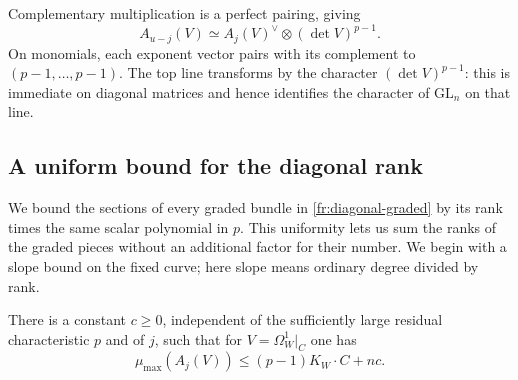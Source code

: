 Complementary multiplication is a perfect pairing, giving
\begin{equation}\label{fr:socle-pairing}
 A_{u-j}(V)\simeq A_j(V)^\vee\otimes(\det V)^{p-1}.
\end{equation}
On monomials, each exponent vector pairs with its complement to
$(p-1,\ldots,p-1)$.  The top line transforms by the character
$(\det V)^{p-1}$: this is immediate on diagonal matrices and hence
 identifies the character of $\mathrm{GL}_n$ on that line.

\subsection{A uniform bound for the diagonal rank}
\label{fr:rank-bound}

We bound the sections of every graded bundle in
\eqref{fr:diagonal-graded} by its rank times the same scalar
polynomial in $p$. This uniformity lets us sum the ranks of the
graded pieces without an additional factor for their number.
We begin with a slope bound on the fixed curve; here slope means
ordinary degree divided by rank.

\begin{lemma}\label{fr:truncated-slope}
There is a constant $c\ge0$, independent of the sufficiently large
residual characteristic $p$ and of $j$, such that for
$V=\Omega_W^1|_C$ one has
\[
 \mu_{\max}(A_j(V))\le(p-1)K_W\cdot C+nc.
\]
\end{lemma}

